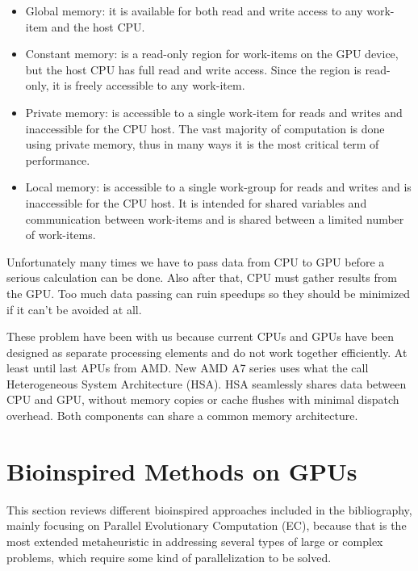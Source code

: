 \documentclass[review]{elsarticle}
\begin{document}
\begin{itemize}
\item Global memory: it is available for both read and write access to any work-item and the host CPU.
\item Constant memory: is a read-only region for work-items on the GPU device, but the host CPU has full read and write access. Since the region is read-only, it is freely accessible to any work-item.
\item Private memory: is accessible to a single work-item for reads and writes and inaccessible for the CPU host. The vast majority of computation is done using private memory, thus in many ways it is the most critical term of performance.
\item Local memory: is accessible to a single work-group for reads and writes and is inaccessible for the CPU host. It is intended for shared variables and communication between work-items and is shared between a limited number of work-items.
\end{itemize} 

Unfortunately many times we have to pass data from CPU to GPU before a serious calculation can be done. Also after that, CPU must gather results from the GPU. Too much data passing can ruin speedups so they should be minimized if it can't be avoided at all.

These problem have been with us because current CPUs and GPUs have been designed as separate processing elements and do not work together efficiently. At least until last APUs from AMD. New AMD A7 series uses what the call Heterogeneous System Architecture (HSA). HSA seamlessly shares data between CPU and GPU, without memory copies or cache flushes with minimal dispatch overhead. Both components can share a common memory architecture.


\section{Bioinspired Methods on GPUs}
\label{sec:bioinfor_apps}

This section reviews different bioinspired approaches included in the bibliography, mainly focusing on Parallel Evolutionary Computation (EC), because that is the most extended metaheuristic in addressing several types of large or complex problems, which require some kind of parallelization to be solved.
\end{document}
